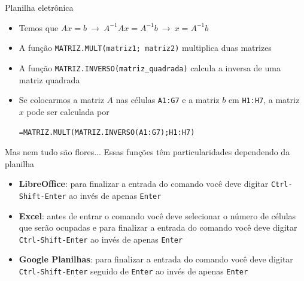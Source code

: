 \begin{frame}[c]{Planilha eletrônica}

\begin{itemize}
    \item Temos que \(Ax=b ~\rightarrow~ A^{-1}Ax=A^{-1}b ~\rightarrow~ x=A^{-1}b\)
    \item A função \texttt{MATRIZ.MULT(matriz1; matriz2)} multiplica duas matrizes
    \item A função \texttt{MATRIZ.INVERSO(matriz\_quadrada)} calcula a inversa de uma matriz quadrada
    \item Se colocarmos a matriz \(A\) nas células \texttt{A1:G7} e a matriz \(b\) em \texttt{H1:H7}, a matriz \(x\) pode ser calculada por
    \begin{center}
        \texttt{=MATRIZ.MULT(MATRIZ.INVERSO(A1:G7);H1:H7)}
    \end{center}
\end{itemize}
    
\end{frame}

\begin{frame}[c]{Mas nem tudo são flores...}
 Essas funções têm particularidades dependendo da planilha
 \begin{itemize}
        \item \textbf{LibreOffice}: para finalizar a entrada do comando você deve digitar \texttt{Ctrl-Shift-Enter} ao invés de apenas \texttt{Enter}
        \item \textbf{Excel}: antes de entrar o comando você deve selecionar o número de células que serão ocupadas e para finalizar a entrada do comando você deve digitar \texttt{Ctrl-Shift-Enter} ao invés de apenas \texttt{Enter}
        \item \textbf{Google Planilhas}: para finalizar a entrada do comando você deve digitar \texttt{Ctrl-Shift-Enter} seguido de \texttt{Enter} ao invés de apenas \texttt{Enter}
    \end{itemize}

\end{frame}

